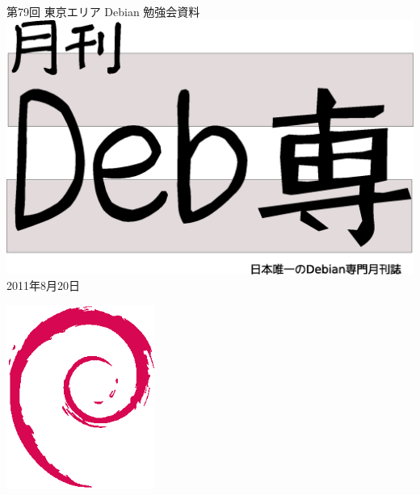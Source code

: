 \documentclass[mingoth,a4paper]{jsarticle}
\newcommand{\debmtgyear}{2011}
\newcommand{\debmtgmonth}{8}
\newcommand{\debmtgdate}{20}
\newcommand{\debmtgnumber}{79}
\begin{document}
\begin{titlepage}
\thispagestyle{empty}

\vspace*{-2cm}
第\debmtgnumber{}回 東京エリア Debian 勉強会資料\\
\hspace*{-2cm}
\includegraphics[width=210mm]{image201003/debsen.eps}\\
\hfill{}\debmtgyear{}年\debmtgmonth{}月\debmtgdate{}日



\vspace*{-2cm}
\hfill{}\includegraphics[height=6cm]{image200502/openlogo-nd.eps}
\end{titlepage}

\end{document}

